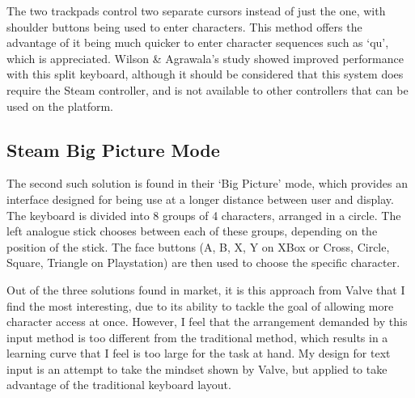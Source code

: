 \documentclass[requirements.tex]{subfiles}
\begin{document}
The two trackpads control two separate cursors instead of just the one, with
shoulder buttons being used to enter characters. This method offers the
advantage of it being much quicker to enter character sequences such as `qu',
which is appreciated. Wilson \& Agrawala's study showed improved performance
with this split keyboard, although it should be considered that this system does
require the Steam controller, and is not available to other controllers that can
be used on the platform.

\subsection{Steam Big Picture Mode} %
\label{sub:steam_big_picture_mode}
The second such solution is found in their `Big Picture' mode, which provides an
interface designed for being use at a longer distance between user and display.
The keyboard is divided into 8 groups of 4 characters, arranged in a circle.
The left analogue stick chooses between each of these groups, depending on the
position of the stick. The face buttons (A, B, X, Y on XBox or Cross, Circle,
Square, Triangle on Playstation) are then used to choose the specific character.

Out of the three solutions found in market, it is this approach from Valve that
I find the most interesting, due to its ability to tackle the goal of allowing
more character access at once. However, I feel that the arrangement demanded by
this input method is too different from the traditional method, which results
in a learning curve that I feel is too large for the task at hand. My design for
text input is an attempt to take the mindset shown by Valve, but applied to
take advantage of the traditional keyboard layout.
\end{document}
